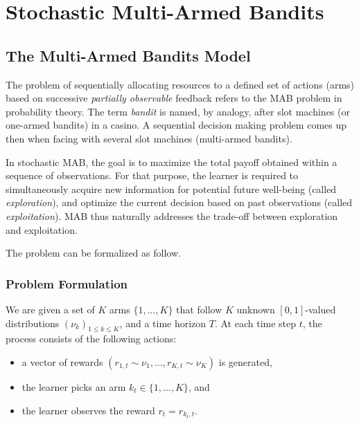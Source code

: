 \chapter{Stochastic Multi-Armed Bandits}\label{chap:mab}
	\minitoc
	\newpage


\section{The Multi-Armed Bandits Model}\label{sec:mab.model}

The problem of sequentially allocating resources to a defined set of actions (arms) based on successive \emph{partially observable} feedback refers to the MAB problem in probability theory. The term \emph{bandit} is named, by analogy, after slot machines (or one-armed bandits) in a casino. A sequential decision making problem comes up then when facing with several slot machines (multi-armed bandits).

In stochastic MAB, the goal is to maximize the total payoff obtained within a sequence of observations. For that purpose, the learner is required to simultaneously acquire new information for potential future well-being (called \emph{exploration}), and optimize the current decision based on past observations (called \emph{exploitation}). MAB thus naturally addresses the trade-off between exploration and exploitation.

The problem can be formalized as follow.

\subsection{Problem Formulation}\label{sec:mab.formulation}

\begin{definition}
	We are given a set of $K$ arms $\{1,\ldots,K\}$ that follow $K$ unknown $[0,1]$-valued distributions $(\nu_k)_{1 \leq k \leq K}$, and a time horizon $T$. At each time step $t$, the process consists of the following actions:
	\begin{itemize}
		\item a vector of rewards $(r_{1,t} \sim \nu_1, \ldots, r_{K,t} \sim \nu_K)$ is generated,
		\item the learner picks an arm $k_t \in \{1,\ldots,K\}$, and
		\item the learner observes the reward $r_t = r_{k_t, t}$.
	\end{itemize}
\end{definition}


